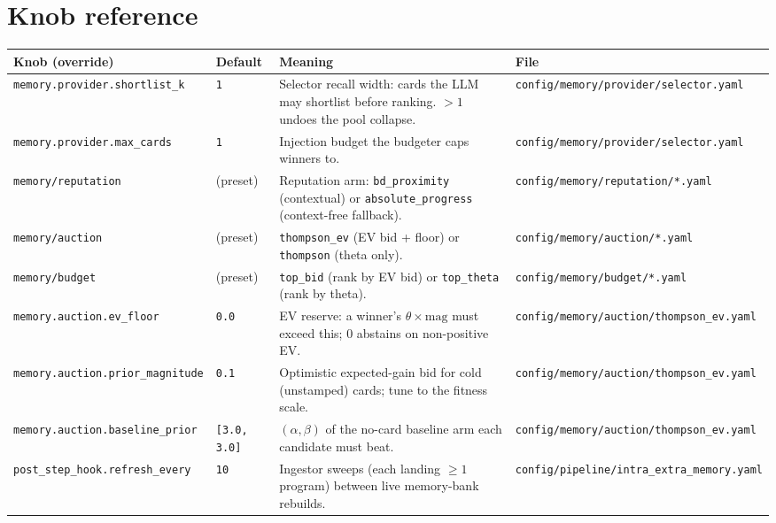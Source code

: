 \documentclass[11pt]{article}
\newcommand{\code}[1]{\texttt{#1}}
\begin{document}
\section{Knob reference}

\begingroup
\setlength{\tabcolsep}{4pt}
\renewcommand{\arraystretch}{1.25}
\footnotesize
\sloppy
\begin{longtable}{>{\raggedright\arraybackslash}p{} >{\raggedright\arraybackslash}p{} >{\raggedright\arraybackslash}p{} >{\raggedright\arraybackslash}p{}}
\toprule
\textbf{Knob (override)} & \textbf{Default} & \textbf{Meaning} & \textbf{File} \\
\midrule
\endhead
\code{memory.provider.shortlist\_k} & \code{1} & Selector recall width: cards the
LLM may shortlist before ranking. $>1$ undoes the pool collapse. &
\code{config/memory/provider/selector.yaml} \\
\code{memory.provider.max\_cards} & \code{1} & Injection budget the budgeter caps
winners to. & \code{config/memory/provider/selector.yaml} \\
\code{memory/reputation} & (preset) & Reputation arm: \code{bd\_proximity}
(contextual) or \code{absolute\_progress} (context-free fallback). &
\code{config/memory/reputation/*.yaml} \\
\code{memory/auction} & (preset) & \code{thompson\_ev} (EV bid + floor) or
\code{thompson} (theta only). & \code{config/memory/auction/*.yaml} \\
\code{memory/budget} & (preset) & \code{top\_bid} (rank by EV bid) or
\code{top\_theta} (rank by theta). & \code{config/memory/budget/*.yaml} \\
\code{memory.auction.ev\_floor} & \code{0.0} & EV reserve: a winner's
$\theta\!\times\!\text{mag}$ must exceed this; $0$ abstains on non-positive EV. &
\code{config/memory/auction/thompson\_ev.yaml} \\
\code{memory.auction.prior\_magnitude} & \code{0.1} & Optimistic expected-gain bid
for cold (unstamped) cards; tune to the fitness scale. &
\code{config/memory/auction/thompson\_ev.yaml} \\
\code{memory.auction.baseline\_prior} & \code{[3.0, 3.0]} & $(\alpha,\beta)$ of the
no-card baseline arm each candidate must beat. &
\code{config/memory/auction/thompson\_ev.yaml} \\
\code{post\_step\_hook.refresh\_every} & \code{10} & Ingestor sweeps (each landing
$\ge1$ program) between live memory-bank rebuilds. &
\code{config/pipeline/intra\_extra\_memory.yaml} \\

\end{longtable}
\end{document}
